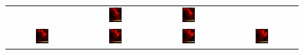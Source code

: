 \begin{figure}[htp]
\begin{tabular}{cccc}
 &  \includegraphics[width=0.2\textwidth]{../figures/sph_bates_starcluster_06.jpg}
 &  \includegraphics[width=0.2\textwidth]{../figures/sph_bates_starcluster_07.jpg} 
 \\
	\includegraphics[width=0.2\textwidth]{../figures/sph_bates_starcluster_08.jpg} 
&   \includegraphics[width=0.2\textwidth]{../figures/sph_bates_starcluster_09.jpg}  
&   \includegraphics[width=0.2\textwidth]{../figures/sph_bates_starcluster_10.jpg}
&   \includegraphics[width=0.2\textwidth]{../figures/sph_bates_starcluster_11.jpg} 
\\

\end{tabular}
\end{figure}
